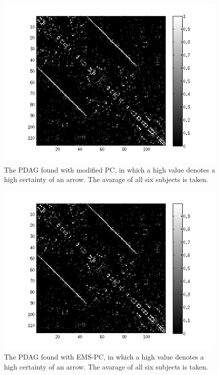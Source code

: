 \documentclass[a4paper, 10pt, english, onecolumn]{article}
\begin{document}
\begin{figure}[h!]
  \centering
  \includegraphics{images/PDAG_avg_mod}
  \caption{The PDAG found with modified PC, in which a high value denotes a high certainty of an arrow. The avarage of all six subjects is taken.}
  \label{fig:pdag_avg_mod}
\end{figure}

\begin{figure}[h!]
  \centering
  \includegraphics{images/PDAG_avg_expl}
  \caption{The PDAG found with EMS-PC, in which a high value denotes a high certainty of an arrow. The avarage of all six subjects is taken.}
  \label{fig:pdag_avg_ems}
\end{figure}
\end{document}
